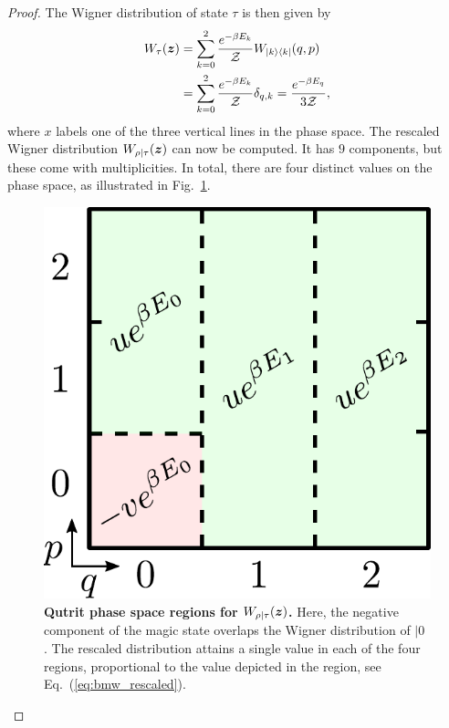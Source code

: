 \documentclass[pra,
aps,
twocolumn,
superscriptaddress,
groupedaddress,
nofootinbib,
reprint
]{revtex4-1}
\begin{document}
\begin{proof}
The Wigner distribution of state $\tau$ is then given by
\begin{align}
	\W[\bmz]{\tau} &= \sum\limits_{k=0}^2 \frac{e^{-\beta E_k}}{\Z}W_{|k\>\<k|}(q, p) \nonumber\\
	&= \sum\limits_{k=0}^2 \frac{e^{-\beta E_k}}{\Z} \delta_{q, k} = \frac{e^{-\beta E_q}}{3\Z},
\end{align}
where $x$ labels one of the three vertical lines in the phase space.
The rescaled Wigner distribution $W_{\rho|\tau}(\bm{z})$ can now be computed. It has $9$ components, but these come with multiplicities. In total, there are four distinct values on the phase space, as illustrated in Fig.~\ref{fig:pd_split}.
\begin{figure}[h]
    \centering
    \includegraphics[scale=0.35]{figs/pd_split_thermal.pdf}
    \caption{\textbf{Qutrit phase space regions for $W_{\rho | \tau}(\bm{z})$.}
    Here, the negative component of the magic state overlaps the Wigner distribution of $|0\>$. The rescaled distribution attains a single value in each of the four regions, proportional to the value depicted in the region, see Eq.~(\ref{eq:bmw_rescaled}).
    }
    \label{fig:pd_split}
\end{figure}


\end{proof}
\end{document}
